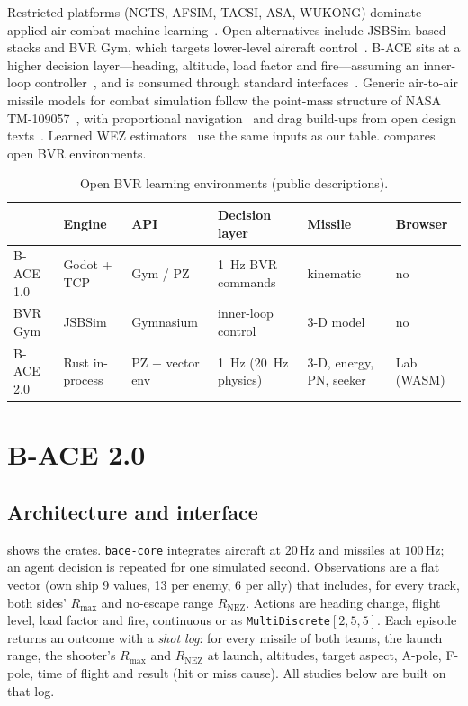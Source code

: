 \documentclass[11pt,a4paper]{article}
\begin{document}
Restricted platforms (NGTS, AFSIM, TACSI, ASA, WUKONG) dominate applied air-combat machine learning~\cite{gorton2024survey}.
Open alternatives include JSBSim-based stacks and BVR Gym, which targets lower-level aircraft control~\cite{scukins2024bvrgym}.
B-ACE sits at a higher decision layer---heading, altitude, load factor and fire---assuming an inner-loop controller~\cite{kuroswiski2024bace,hu2021bvr}, and is consumed through standard interfaces~\cite{terry2021pettingzoo,towers2023gymnasium}.
Generic air-to-air missile models for combat simulation follow the point-mass structure of NASA TM-109057~\cite{nasa1994generic}, with proportional navigation~\cite{zarchan2012guidance} and drag build-ups from open design texts~\cite{fleeman2012missile,nswc1981aero}.
Learned WEZ estimators~\cite{dantas2021wez} use the same inputs as our table.
 compares open BVR environments.

\begin{table}[!htbp]
\centering
\caption{Open BVR learning environments (public descriptions).}
\label{tab:cmp}
\scriptsize
\begin{tabular}{@{}llllll@{}}
\toprule
 & Engine & API & Decision layer & Missile & Browser \\
\midrule
B-ACE 1.0 & Godot + TCP & Gym / PZ & 1~Hz BVR commands & kinematic & no \\
BVR Gym & JSBSim & Gymnasium & inner-loop control & 3-D model & no \\
B-ACE 2.0 & Rust in-process & PZ + vector env & 1~Hz (20~Hz physics) & 3-D, energy, PN, seeker & Lab (WASM) \\
\bottomrule
\end{tabular}
\end{table}

\section{B-ACE 2.0}

\subsection{Architecture and interface}

 shows the crates.
\texttt{bace-core} integrates aircraft at $20\,\mathrm{Hz}$ and missiles at $100\,\mathrm{Hz}$; an agent decision is repeated for one simulated second.
Observations are a flat vector (own ship 9 values, 13 per enemy, 6 per ally) that includes, for every track, both sides' $R_{\max}$ and no-escape range $R_{\mathrm{NEZ}}$.
Actions are heading change, flight level, load factor and fire, continuous or as \texttt{MultiDiscrete}$[2,5,5]$.
Each episode returns an outcome with a \emph{shot log}: for every missile of both teams, the launch range, the shooter's $R_{\max}$ and $R_{\mathrm{NEZ}}$ at launch, altitudes, target aspect, A-pole, F-pole, time of flight and result (hit or miss cause).
All studies below are built on that log.
\end{document}
